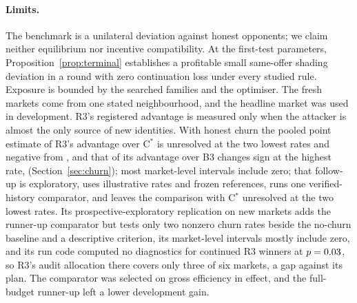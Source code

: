 \documentclass[11pt]{article}
\begin{document}
\paragraph{Limits.} The benchmark is a unilateral deviation against honest opponents; we claim neither equilibrium nor incentive compatibility. At the first-test parameters, Proposition~\ref{prop:terminal} establishes a profitable small same-offer shading deviation in a round with zero continuation loss under every studied rule. Exposure is bounded by the searched families and the optimiser. The fresh markets come from one stated neighbourhood, and the headline market was used in development. R3's registered advantage is measured only when the attacker is almost the only source of new identities. With honest churn the pooled point estimate of R3's advantage over C$^*$ is unresolved at the two lowest rates and negative from , and that of its advantage over B3 changes sign at the highest rate,  (Section~\ref{sec:churn}); most market-level intervals include zero; that follow-up is exploratory, uses illustrative rates and frozen references, runs one verified-history comparator, and leaves the comparison with C$^*$ unresolved at the two lowest rates. Its prospective-exploratory replication on new markets adds the runner-up comparator but tests only two nonzero churn rates beside the no-churn baseline and a descriptive criterion, its market-level intervals mostly include zero, and its run code computed no diagnostics for continued R3 winners at $p = 0.03$, so R3's audit allocation there covers only three of six markets, a gap against its plan. The comparator was selected on gross efficiency in effect, and the full-budget runner-up left a lower development gain.
\end{document}
